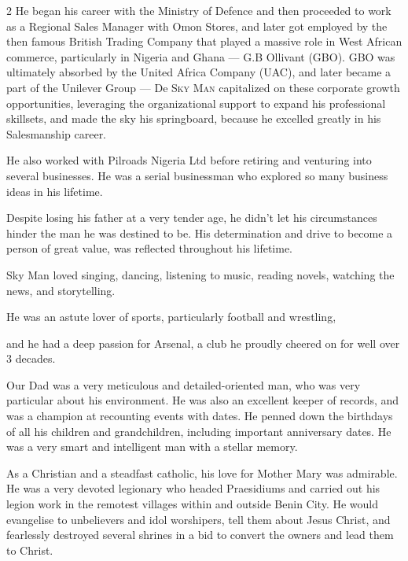 \begin{multicols}{2}
  He began his career with the Ministry of Defence and then proceeded to work
  as a Regional Sales Manager with Omon Stores, and later got employed by the
  then famous British Trading Company that played a massive role in West
  African commerce, particularly in Nigeria and Ghana --- G.B Ollivant (GBO). GBO was ultimately absorbed by the United Africa Company (UAC), and later
  became a part of the Unilever Group --- De \textsc{Sky Man} capitalized on
  these corporate growth opportunities, leveraging the organizational
  support to expand his professional skillsets, and made the sky his
  springboard, because he excelled greatly in his Salesmanship career.

  He also worked with Pilroads Nigeria Ltd before retiring and venturing into
  several businesses. He was a serial businessman who explored so many
  business ideas in his lifetime.

  Despite losing his father at a very tender age, he didn't let his
  circumstances hinder the man he was destined to be. His determination and
  drive to become a person of great value, was reflected throughout his
  lifetime.


  Sky Man loved singing, dancing, listening to music, reading novels, watching the news, and storytelling.

  He was an astute lover of sports, particularly football and wrestling,

  and he had a deep passion for Arsenal, a club he proudly cheered on for well
  over 3 decades.

  Our Dad was a very meticulous and detailed-oriented man, who was very
  particular about his environment. He was also an excellent keeper of
  records, and was a champion at recounting events with dates. He penned down
  the birthdays of all his children and grandchildren, including important
  anniversary dates. He was a very smart and intelligent man with a stellar
  memory.


  As a Christian and a steadfast catholic, his love for Mother Mary was
  admirable. He was a very devoted legionary who headed Praesidiums and
  carried out his legion work in the remotest villages within and outside
  Benin City. He would evangelise to unbelievers and idol worshipers, tell
  them about Jesus Christ, and fearlessly destroyed several shrines in a bid
  to convert the owners and lead them to Christ.


\end{multicols}
